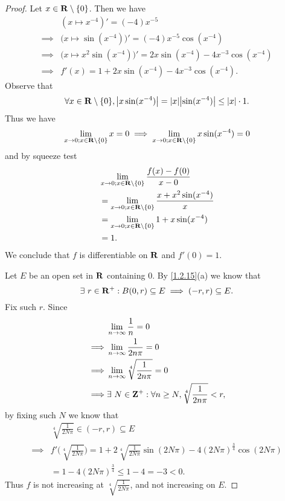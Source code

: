 \begin{proof}
  Let \(x \in \mathbf{R} \setminus \{0\}\).
  Then we have
  \begin{align*}
             & (x \mapsto x^{-4})' = (-4) x^{-5}                                               \\
    \implies & \big(x \mapsto \sin(x^{-4})\big)' = (-4) x^{-5} \cos(x^{-4})                    \\
    \implies & \big(x \mapsto x^2 \sin(x^{-4})\big)' = 2x \sin(x^{-4}) - 4 x^{-3} \cos(x^{-4}) \\
    \implies & f'(x) = 1 + 2 x \sin(x^{-4}) - 4 x^{-3} \cos(x^{-4}).
  \end{align*}
  Observe that
  \[
    \forall x \in \R \setminus \{0\}, \abs{x \sin(x^{-4})} = \abs{x} \abs{\sin(x^{-4})} \leq \abs{x} \cdot 1.
  \]
  Thus we have
  \[
    \lim_{x \to 0 ; x \in \mathbf{R} \setminus \{0\}} x = 0 \implies \lim_{x \to 0 ; x \in \mathbf{R} \setminus \{0\}} x \sin(x^{-4}) = 0
  \]
  and by squeeze test
  \begin{align*}
     & \lim_{x \to 0 ; x \in \mathbf{R} \setminus \{0\}} \frac{f(x) - f(0)}{x - 0}        \\
     & = \lim_{x \to 0 ; x \in \mathbf{R} \setminus \{0\}} \frac{x + x^2 \sin(x^{-4})}{x} \\
     & = \lim_{x \to 0 ; x \in \mathbf{R} \setminus \{0\}} 1 + x \sin(x^{-4})             \\
     & = 1.
  \end{align*}
  We conclude that \(f\) is differentiable on \(\mathbf{R}\) and \(f'(0) = 1\).

  Let \(E\) be an open set in \(\mathbf{R}\) containing \(0\).
  By \cref{1.2.15}(a) we know that
  \[
    \exists\ r \in \mathbf{R}^+ : B(0, r) \subseteq E \implies (-r, r) \subseteq E.
  \]
  Fix such \(r\).
  Since
  \begin{align*}
             & \lim_{n \to \infty} \frac{1}{n} = 0                                      \\
    \implies & \lim_{n \to \infty} \frac{1}{2 n \pi} = 0                                \\
    \implies & \lim_{n \to \infty} \sqrt[4]{\frac{1}{2 n \pi}} = 0                      \\
    \implies & \exists\ N \in \mathbf{Z}^+ : \forall n \geq N, \sqrt[4]{\frac{1}{2 n \pi}} < r,
  \end{align*}
  by fixing such \(N\) we know that
  \begin{align*}
             & \sqrt[4]{\frac{1}{2 N \pi}} \in (-r, r) \subseteq E                                                                                   \\
    \implies & f'\bigg(\sqrt[4]{\frac{1}{2 N \pi}}\bigg) = 1 + 2 \sqrt[4]{\frac{1}{2 N \pi}} \sin(2 N \pi) - 4 (2 N \pi)^{\frac{3}{4}} \cos(2 N \pi) \\
             & = 1 - 4 (2 N \pi)^{\frac{3}{4}} \leq 1 - 4 = -3 < 0.
  \end{align*}
  Thus \(f\) is not increasing at \(\sqrt[4]{\frac{1}{2 N \pi}}\), and not increasing on \(E\).
\end{proof}

